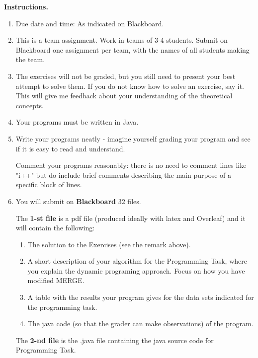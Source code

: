 \documentclass[11pt]{article}
\begin{document}
\vline

\textbf{Instructions.}
\begin{enumerate}
\item Due date and time: As indicated on Blackboard. 
\item This is a team assignment. Work in teams of 3-4 students.  Submit on Blackboard one assignment per team, with the names of all students making the team. 
\item The exercises will not be graded, but you still need to present your best attempt to solve them. If you do not know how to solve an exercise, say it.  This will give me feedback about your understanding of the theoretical concepts.
\item Your programs must be written in Java.

\item Write your programs neatly - imagine yourself grading your program and see if it is easy to read and understand. 

Comment your programs reasonably: there is no need to comment lines like "i++" but do include brief comments describing the main purpose of a specific block of lines.
\item  You will submit on \textbf{Blackboard} 32 files.  

The \textbf{1-st file} is a pdf file (produced ideally with latex and Overleaf) and it will contain the following:
\begin{enumerate}
\item The solution to the Exercises (see the remark above).
\item   A short description of your algorithm for the Programming Task, where you explain the dynamic programing approach. Focus on how you have modified MERGE.
\item   A table with the results your program gives  for the data sets indicated for the programming task. 
\item   The java code (so that the grader can make observations) of the  program.
\end{enumerate}


The \textbf{2-nd file} is the .java file containing the java source code for Programming Task.

\end{enumerate}
\newpage
\end{document}
